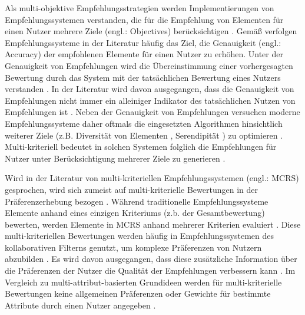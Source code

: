 Als multi-objektive Empfehlungsstrategien werden Implementierungen von Empfehlungssystemen verstanden, die für die Empfehlung von Elementen für einen Nutzer mehrere Ziele (engl.: Objectives) berücksichtigen \cite[S. 850]{adomavicius:4:inbook}.
Gemäß \textcite[S. 1097]{mcnee:inproceedings} verfolgen Empfehlungssysteme in der Literatur häufig das Ziel, die Genauigkeit (engl.: Accuracy) der empfohlenen Elemente für einen Nutzer zu erhöhen.
Unter der Genauigkeit von Empfehlungen wird die Übereinstimmung einer vorhergesagten Bewertung durch das System mit der tatsächlichen Bewertung eines Nutzers verstanden \cite[S. 1098]{mcnee:inproceedings}.
In der Literatur wird davon ausgegangen, dass die Genauigkeit von Empfehlungen nicht immer ein alleiniger Indikator des tatsächlichen Nutzen von Empfehlungen ist \cite[S. 896]{adomavicius:article}\cite[S. 850]{adomavicius:4:inbook}\cite[S. 1097]{mcnee:inproceedings}.
Neben der Genauigkeit von Empfehlungen versuchen moderne Empfehlungssysteme daher oftmals die eingesetzten Algorithmen hinsichtlich weiterer Ziele (z.B. Diversität von Elementen \cite[S. 896]{adomavicius:article}, Serendipität \cite[S. 1099]{mcnee:inproceedings}) zu optimieren \cite[S. 850]{adomavicius:4:inbook}.
Multi-kriteriell bedeutet in solchen Systemen folglich die Empfehlungen für Nutzer unter Berücksichtigung mehrerer Ziele zu generieren \cite[S. 850]{adomavicius:4:inbook}.

Wird in der Literatur von multi-kriteriellen Empfehlungssystemen (engl.: \ac{MCRS}) gesprochen, wird sich zumeist auf multi-kriterielle Bewertungen in der Präferenzerhebung bezogen \cite[S. 1156]{gupta:inproceedings}\cite[S. 327]{hassan:inproceedings}\cite[S. 207]{hdioud:inproceedings}\cite[S. 2453]{zheng:inproceedings}.
Während traditionelle Empfehlungssysteme Elemente anhand eines einzigen Kriteriums (z.b. der Gesamtbewertung) bewerten, werden Elemente in \ac{MCRS} anhand mehrerer Kriterien evaluiert \cite[S. 850]{adomavicius:4:inbook}\cite[S. 2]{adomavicius:5:inbook}.
Diese multi-kriteriellen Bewertungen werden häufig in Empfehlungssystemen des kollaborativen Filterns genutzt, um komplexe Präferenzen von Nutzern abzubilden \cite[S. 850]{adomavicius:4:inbook}.
Es wird davon ausgegangen, dass diese zusätzliche Information \cite[S. 49]{adomavicius:inproceedings:2} über die Präferenzen der Nutzer die Qualität der Empfehlungen verbessern kann \cite[S. 2]{adomavicius:5:inbook}.
Im Vergleich zu multi-attribut-basierten Grundideen werden für multi-kriterielle Bewertungen keine allgemeinen Präferenzen oder Gewichte für bestimmte Attribute durch einen Nutzer angegeben \cite[S. 851]{adomavicius:4:inbook}.

